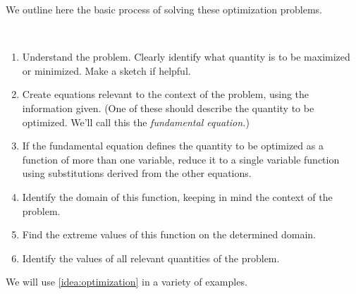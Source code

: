 We outline here the basic process of solving these optimization problems.
\begin{keyidea}\label{idea:optimization}%
~\\[-\baselineskip]
\parbox[t]{\linewidth}{\begin{enumerate}
	\item	Understand the problem. Clearly identify what quantity is to be maximized or minimized. Make a sketch if helpful.
	\item	Create equations relevant to the context of the problem, using the information given. (One of these should describe the quantity to be optimized. We'll call this the \emph{fundamental equation.})
	\item	If the fundamental equation defines the quantity to be optimized as a function of more than one variable, reduce it to a single variable function using substitutions derived from the other equations.
	\item	Identify the domain of this function, keeping in mind the context of the problem.
	\item	Find the extreme values of this function on the determined domain.
	\item	Identify the values of all relevant quantities of the problem.
\end{enumerate}}
\end{keyidea}

We will use \autoref{idea:optimization} in a variety of examples.

